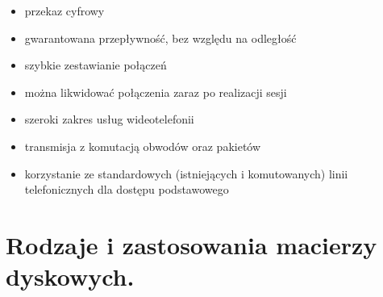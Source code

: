 \documentclass[12pt,a4paper]{article}
\begin{document}
	\begin{itemize}
		\item przekaz cyfrowy
		\item gwarantowana przepływność, bez względu na odległość
		\item szybkie zestawianie połączeń
		\item można likwidować połączenia zaraz po realizacji sesji
		\item szeroki zakres usług wideotelefonii
		\item transmisja z komutacją obwodów oraz pakietów
		\item korzystanie ze standardowych (istniejących i komutowanych) linii telefonicznych dla dostępu podstawowego
	\end{itemize}

	\section{Rodzaje i zastosowania macierzy dyskowych.}
\end{document}
